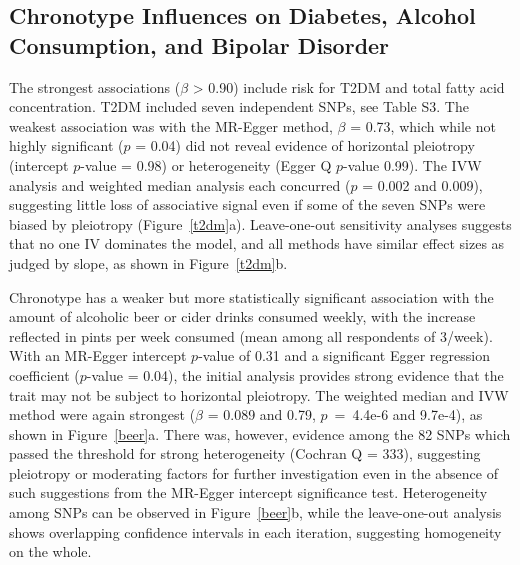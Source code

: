 \documentclass[genes,article,accept,moreauthors,pdftex]{Definitions/mdpi}
\begin{document}
\subsection{Chronotype Influences on Diabetes, Alcohol Consumption, and Bipolar Disorder}
The strongest associations ($\beta$ > 0.90) include risk for T2DM and total fatty acid concentration. T2DM included seven independent SNPs, see {{Table S3}}. The weakest association was with the MR-Egger method, $\beta$ = 0.73, which while not highly significant ($p$ = 0.04) did not reveal evidence of horizontal pleiotropy (intercept $p$-value = 0.98) or heterogeneity (Egger Q $p$-value 0.99). The IVW analysis and weighted median analysis each concurred ($p$ = 0.002 and 0.009), suggesting little loss of associative signal even if some of the seven SNPs were biased by pleiotropy (Figure~\ref{t2dm}a). Leave-one-out sensitivity analyses suggests that no one IV dominates the model, and all methods have similar effect sizes as judged by slope, as shown in Figure~\ref{t2dm}b. 

Chronotype has a weaker but more statistically significant association with the amount of alcoholic beer or cider drinks consumed weekly, with the increase reflected in pints per week consumed (mean among all respondents of 3/week). With an MR-Egger intercept $p$-value of 0.31 and a significant Egger regression coefficient ($p$-value = 0.04), the initial analysis provides strong evidence that the trait may not be subject to horizontal pleiotropy. The weighted median and IVW method were again strongest ($\beta$ = 0.089 and 0.79, \mbox{$p$ = 4.4e-6} and 9.7e-4), as shown in Figure~\ref{beer}a. There was, however, evidence among the 82 SNPs which passed the threshold for strong heterogeneity (Cochran Q = 333), suggesting pleiotropy or moderating factors for further investigation even in the absence of such suggestions from the MR-Egger intercept significance test. Heterogeneity among SNPs can be observed in Figure~\ref{beer}b, while the leave-one-out analysis shows overlapping confidence intervals in each iteration, suggesting homogeneity on the whole.
\end{document}
